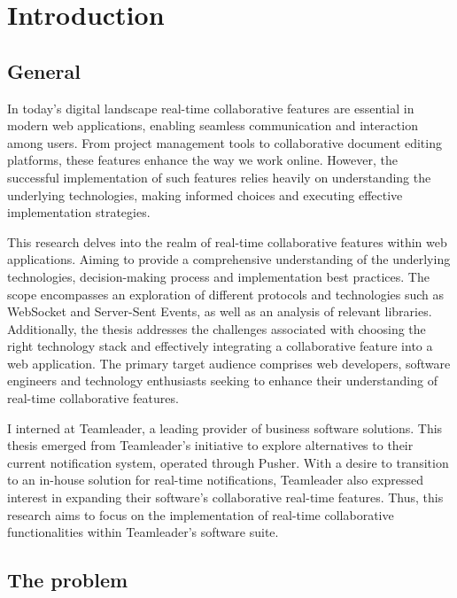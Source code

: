 \newpage

\section{Introduction}

\subsection{General}

In today's digital landscape real-time collaborative features are essential in modern web applications, enabling seamless communication and interaction among users. From project management tools to collaborative document editing platforms, these features enhance the way we work online. However, the successful implementation of such features relies heavily on understanding the underlying technologies, making informed choices and executing effective implementation strategies.

This research delves into the realm of real-time collaborative features within web applications. Aiming to provide a comprehensive understanding of the underlying technologies, decision-making process and implementation best practices. The scope encompasses an exploration of different protocols and technologies such as WebSocket and Server-Sent Events, as well as an analysis of relevant libraries. Additionally, the thesis addresses the challenges associated with choosing the right technology stack and effectively integrating a collaborative feature into a web application. The primary target audience comprises web developers, software engineers and technology enthusiasts seeking to enhance their understanding of real-time collaborative features.

I interned at Teamleader, a leading provider of business software solutions. This thesis emerged from Teamleader's initiative to explore alternatives to their current notification system, operated through Pusher. With a desire to transition to an in-house solution for real-time notifications, Teamleader also expressed interest in expanding their software's collaborative real-time features. Thus, this research aims to focus on the implementation of real-time collaborative functionalities within Teamleader's software suite.

\subsection{The problem}

